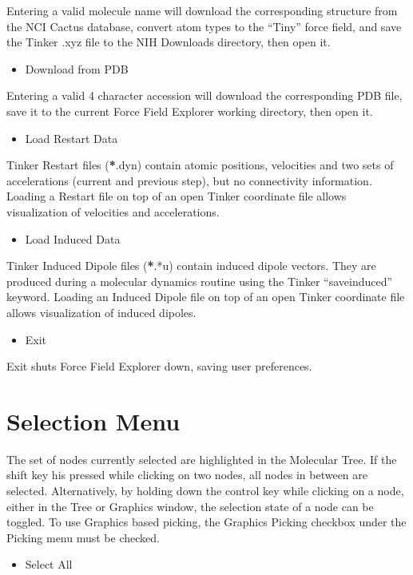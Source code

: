 \documentclass[letterpaper,11pt,english]{sphinxmanual}
\begin{document}
Entering a valid molecule name will download the corresponding structure from the NCI Cactus database, convert atom types to the “Tiny” force field, and save the Tinker .xyz file to the NIH Downloads directory, then open it.
\begin{itemize}
\item {} 
Download from PDB

\end{itemize}

Entering a valid 4 character accession will download the corresponding PDB file, save it to the current Force Field Explorer working directory, then open it.
\begin{itemize}
\item {} 
Load Restart Data

\end{itemize}

Tinker Restart files ({\color{red}\bfseries{}*}.dyn) contain atomic positions, velocities and two sets of accelerations (current and previous step), but no connectivity information. Loading a Restart file on top of an open Tinker coordinate file allows visualization of velocities and accelerations.
\begin{itemize}
\item {} 
Load Induced Data

\end{itemize}

Tinker Induced Dipole files ({\color{red}\bfseries{}*}.*u) contain induced dipole vectors. They are produced during a molecular dynamics routine using the Tinker “save\sphinxhyphen{}induced” keyword. Loading an Induced Dipole file on top of an open Tinker coordinate file allows visualization of induced dipoles.
\begin{itemize}
\item {} 
Exit

\end{itemize}

Exit shuts Force Field Explorer down, saving user preferences.


\section{Selection Menu}
\label{\detokenize{text/menus:selection-menu}}
The set of nodes currently selected are highlighted in the Molecular Tree. If the shift key his pressed while clicking on two nodes, all nodes in between are selected. Alternatively, by holding down the control key while clicking on a node, either in the Tree or Graphics window, the selection state of a node can be toggled. To use Graphics based picking, the Graphics Picking checkbox under the Picking menu must be checked.
\begin{itemize}
\item {} 
Select All

\end{itemize}
\end{document}
